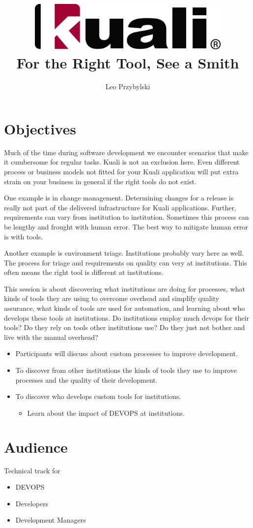 \documentclass[12pt,notitlepage]{article}
\author{Leo Przybylski}
\title{\includegraphics[width=0.75\textwidth]{kuali_base.png}\\For the Right Tool, See a Smith}
\date{}
\begin{document}
\maketitle
{}

\section{Objectives}

Much of the time during software development we encounter
  scenarios that make it cumbersome for regular tasks. Kuali is not an
exclusion here. Even different process or business models not fitted
for your Kuali application will put extra strain on your business in
general if the right tools do not exist. 

One example is in change
management. Determining changes for a release is really not part of
the delivered infrastructure for Kuali applications. Further, requirements can
vary from institution to institution. Sometimes this process can be
lengthy and frought with human error. The best way to mitigate human
error is with tools.

Another example is environment triage. Institutions probably vary here
as well. The process for triage and requirements on quality can very
at institutions. This often means the right tool is different at
institutions.

This session is about discovering what institutions are doing for
processes, what kinds of tools they are using to overcome overhead and 
simplify quality assurance, what kinds of tools are used for
automation,
 and learning about who develops these
tools at institutions. Do institutions employ much devops for their
tools? Do they rely on tools other institutions use? Do they just not
bother and live with the manual overhead?


\begin{itemize}
\item Participants will discuss about custom processes to improve
  development.
\item To discover from other institutions the kinds of tools they use
  to improve processes and the quality of their development.
\item To discover who develops custom tools for institutions.
  \begin{itemize}
    \item Learn about the impact of DEVOPS at institutions.
  \end{itemize}
\end{itemize}

\section{Audience}
Technical track for
\begin{itemize}
\item DEVOPS
\item Developers
\item Development Managers
\end{itemize}
\end{document}
